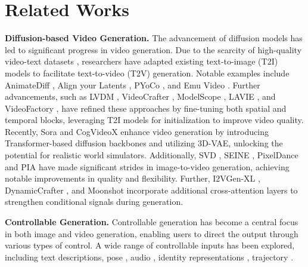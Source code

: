 \section{Related Works}
\label{sec:related_works}


\noindent\textbf{Diffusion-based Video Generation. }
The advancement of diffusion models \cite{rombach2022high, ramesh2022hierarchical, zheng2022entropy} has led to significant progress in video generation. Due to the scarcity of high-quality video-text datasets \cite{Blattmann2023, Blattmann2023a}, researchers have adapted existing text-to-image (T2I) models to facilitate text-to-video (T2V) generation. Notable examples include AnimateDiff \cite{Guo2023}, Align your Latents \cite{Blattmann2023a}, PYoCo \cite{ge2023preserve}, and Emu Video \cite{girdhar2023emu}. Further advancements, such as LVDM \cite{he2022latent}, VideoCrafter \cite{chen2023videocrafter1, chen2024videocrafter2}, ModelScope \cite{wang2023modelscope}, LAVIE \cite{wang2023lavie}, and VideoFactory \cite{wang2024videofactory}, have refined these approaches by fine-tuning both spatial and temporal blocks, leveraging T2I models for initialization to improve video quality.
Recently, Sora \cite{brooks2024video} and CogVideoX \cite{yang2024cogvideox} enhance video generation by introducing Transformer-based diffusion backbones \cite{Peebles2023, Ma2024, Yu2024} and utilizing 3D-VAE, unlocking the potential for realistic world simulators. Additionally, SVD \cite{Blattmann2023}, SEINE \cite{chen2023seine}, PixelDance \cite{zeng2024make} and PIA \cite{zhang2024pia} have made significant strides in image-to-video generation, achieving notable improvements in quality and flexibility.
Further, I2VGen-XL \cite{zhang2023i2vgen}, DynamicCrafter \cite{Xing2023}, and Moonshot \cite{zhang2024moonshot} incorporate additional cross-attention layers to strengthen conditional signals during generation.



\noindent\textbf{Controllable Generation.}
Controllable generation has become a central focus in both image \citep{Zhang2023,jiang2024survey, Mou2024, Zheng2023, peng2024controlnext, ye2023ip, wu2024spherediffusion, song2024moma, wu2024ifadapter} and video \citep{gong2024atomovideo, zhang2024moonshot, guo2025sparsectrl, jiang2024videobooth} generation, enabling users to direct the output through various types of control. A wide range of controllable inputs has been explored, including text descriptions, pose \citep{ma2024follow,wang2023disco,hu2024animate,xu2024magicanimate}, audio \citep{tang2023anytoany,tian2024emo,he2024co}, identity representations \citep{chefer2024still,wang2024customvideo,wu2024customcrafter}, trajectory \citep{yin2023dragnuwa,chen2024motion,li2024generative,wu2024motionbooth, namekata2024sg}.


